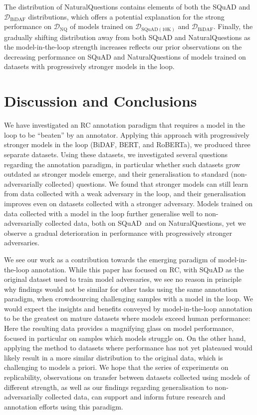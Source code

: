 \documentclass[11pt,a4paper]{article}
\newcommand{\dataset}[1]{\ensuremath{\mathcal{D_{\mathrm{#1}}}}}
\newcommand{\squad}{SQuAD}
\newcommand{\naturalquestions}{NaturalQuestions}
\begin{document}
The distribution of {\naturalquestions} contains elements of both the \squad{} and \dataset{BiDAF} distributions, which offers a potential explanation for the strong performance on \dataset{NQ} of models trained on \dataset{SQuAD(10K)} and \dataset{BiDAF}.
Finally, the gradually shifting distribution away from both \squad{} and \naturalquestions{} as the model-in-the-loop strength increases reflects our prior observations on the decreasing performance on \squad{} and \naturalquestions{} of models trained on datasets with progressively stronger models in the loop.


\section{Discussion and Conclusions}
We have investigated an RC annotation paradigm that requires a model in the loop to be ``beaten'' by an annotator.
Applying this approach with progressively stronger models in the loop (BiDAF, BERT, and RoBERTa), we produced three separate datasets.
Using these datasets, we investigated several questions regarding the annotation paradigm, in particular whether such datasets grow outdated as stronger models emerge, and their generalisation to standard (non-adversarially collected) questions. 
We found that stronger models can still learn from data collected with a weak adversary in the loop, and their generalisation improves even on datasets collected with a stronger adversary.
Models trained on data collected with a model in the loop further generalise well to non-adversarially collected data, both on \squad~and on \naturalquestions, yet we observe a gradual deterioration in performance with progressively stronger adversaries.



We see our work as a contribution towards the emerging paradigm of model-in-the-loop annotation.
While this paper has focused on RC, with {\squad} as the original dataset used to train model adversaries, we see no reason in principle why findings would not be similar for other tasks using the same annotation paradigm, when crowdsourcing challenging samples with a model in the loop.
We would expect the insights and benefits conveyed by model-in-the-loop annotation to be the greatest on mature datasets where models exceed human performance: Here the resulting data provides a magnifying glass on model performance, focused in particular on samples which models struggle on.
On the other hand, applying the method to datasets where performance has not yet plateaued would likely result in a more similar distribution to the original data, which is challenging to models a priori.
We hope that the series of experiments on replicability, observations on transfer between datasets collected using models of different strength, as well as our findings regarding generalisation to non-adversarially collected data, can support and inform future research and annotation efforts using this paradigm.
\end{document}

